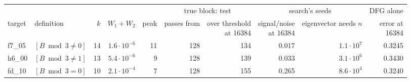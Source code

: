 \begin{tabular}{@{}llrrrrrrrr@{}}
\toprule
& & & & & \multicolumn{2}{c}{true block: test} & \multicolumn{2}{c}{search's seeds} & DFG alone\\
\cmidrule(lr){6-7}\cmidrule(lr){8-9}
target & definition & $k$ & $W_1+W_2$ & peak & passes from & \hd{over threshold\\at 16384} & \hd{signal/noise\\at 16384} & \hd{eigenvector\\needs $n$} & \hd{error at\\16384}\\
\midrule
f7\_05 & $[B\bmod3 \ne 0]$ & 14 & $1.6\cdot10^{-6}$ & 11 & 128 & 134 & 0.017 & $1.1\cdot10^{7}$ & 0.3245\\
h6\_00 & $[B\bmod3 \ne 1]$ & 13 & $5.4\cdot10^{-6}$ & 9 & 128 & 139 & 0.033 & $3.1\cdot10^{6}$ & 0.3430\\
fd\_10 & $[B\bmod3 = 0]$ & 10 & $2.1\cdot10^{-4}$ & 7 & 128 & 155 & 0.265 & $8.6\cdot10^{4}$ & 0.3240\\
\bottomrule
\end{tabular}

